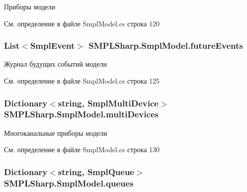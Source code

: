 Приборы модели 



См. определение в файле Smpl\-Model.\-cs строка 120

\hypertarget{class_s_m_p_l_sharp_1_1_smpl_model_ac57b9b5e15eb34682873492bab42445f}{
\subsubsection[{future\-Events}]{\setlength{\rightskip}{0pt plus 5cm}List$<${\bf Smpl\-Event}$>$ S\-M\-P\-L\-Sharp.\-Smpl\-Model.\-future\-Events\hspace{0.3cm}{\ttfamily [protected]}}}\label{df/d34/class_s_m_p_l_sharp_1_1_smpl_model_ac57b9b5e15eb34682873492bab42445f}


Журнал будущих событий модели 



См. определение в файле Smpl\-Model.\-cs строка 125

\hypertarget{class_s_m_p_l_sharp_1_1_smpl_model_a711b2226de9b75bd541ddca587fb5e45}{
\subsubsection[{multi\-Devices}]{\setlength{\rightskip}{0pt plus 5cm}Dictionary$<$string, {\bf Smpl\-Multi\-Device}$>$ S\-M\-P\-L\-Sharp.\-Smpl\-Model.\-multi\-Devices\hspace{0.3cm}{\ttfamily [protected]}}}\label{df/d34/class_s_m_p_l_sharp_1_1_smpl_model_a711b2226de9b75bd541ddca587fb5e45}


Многоканальные приборы модели 



См. определение в файле Smpl\-Model.\-cs строка 130

\hypertarget{class_s_m_p_l_sharp_1_1_smpl_model_ace458c3e9bb07de68137027426eeee82}{
\subsubsection[{queues}]{\setlength{\rightskip}{0pt plus 5cm}Dictionary$<$string, {\bf Smpl\-Queue}$>$ S\-M\-P\-L\-Sharp.\-Smpl\-Model.\-queues\hspace{0.3cm}{\ttfamily [protected]}}}\label{df/d34/class_s_m_p_l_sharp_1_1_smpl_model_ace458c3e9bb07de68137027426eeee82}


